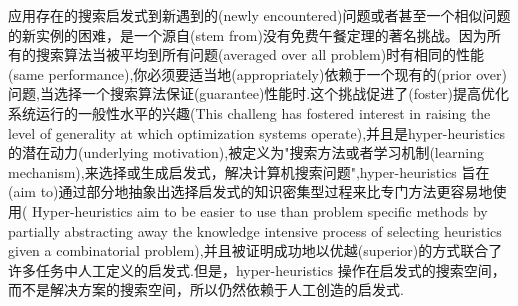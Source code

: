 \documentclass[a4paper,UTF8]{ctexart}
\theoremstyle{definition}
\begin{document}
应用存在的搜索启发式到新遇到的(newly encountered)问题或者甚至一个相似问题的新实例的困难，是一个源自(stem from)没有免费午餐定理的著名挑战。因为所有的搜索算法当被平均到所有问题(averaged over all problem)时有相同的性能(same performance),你必须要适当地(appropriately)依赖于一个现有的(prior over)问题,当选择一个搜索算法保证(guarantee)性能时.这个挑战促进了(foster)提高优化系统运行的一般性水平的兴趣(This challeng has fostered interest in raising the level of generality at which optimization systems operate),并且是hyper-heuristics的潜在动力(underlying motivation),被定义为"搜索方法或者学习机制(learning mechanism),来选择或生成启发式，解决计算机搜索问题",hyper-heuristics 旨在(aim to)通过部分地抽象出选择启发式的知识密集型过程来比专门方法更容易地使用( Hyper-heuristics aim to be easier to use than problem specific methods by partially abstracting away the knowledge intensive process of selecting heuristics given a combinatorial problem),并且被证明成功地以优越(superior)的方式联合了许多任务中人工定义的启发式.但是，hyper-heuristics 操作在启发式的搜索空间，而不是解决方案的搜索空间，所以仍然依赖于人工创造的启发式.
\end{document}
